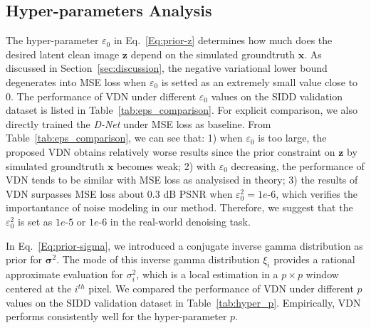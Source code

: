 \documentclass{article}
\begin{document}
\vspace{-1mm}\subsection{Hyper-parameters Analysis}\vspace{-1mm}
The hyper-parameter $\varepsilon_0$ in Eq.~\eqref{Eq:prior-z} determines how much does the desired latent clean
image $\bm{z}$ depend on the simulated groundtruth $\bm{x}$. As discussed in Section~\ref{sec:discussion}, the
negative variational lower bound degenerates into MSE loss when $\varepsilon_0$ is setted as an extremely small
value close to 0. The performance of VDN under different $\varepsilon_0$ values on the SIDD validation dataset
is listed in Table~\ref{tab:eps_comparison}. For explicit comparison, we also directly trained the \textit{D-Net} 
under MSE loss as baseline. From Table~\ref{tab:eps_comparison}, we can see that: 1) when $\varepsilon_0$ is too
large, the proposed VDN obtains relatively worse results since the prior constraint on $\bm{z}$ by simulated
groundtruth $\bm{x}$ becomes weak; 2) with $\varepsilon_0$ decreasing, the performance of VDN tends to be similar
with MSE loss as analysised in theory; 3) the results of VDN surpasses MSE loss about 0.3 dB PSNR
when $\varepsilon_0^2=1e\text{-}6$, which verifies the importantance of noise modeling in our method. Therefore, 
we suggest that the $\varepsilon_0^2$ is set as $1e\text{-}5$ or $1e\text{-}6$ in the real-world denoising task.

In Eq.~\eqref{Eq:prior-sigma}, we introduced a conjugate inverse gamma distribution as prior for $\bm{\sigma}^2$.
The mode of this inverse gamma distribution $\xi_i$ provides a rational approximate evaluation for $\sigma_i^2$,
which is a local estimation in a $p \times p$ window centered at the $i^{th}$ pixel. We compared the performance
of VDN under different $p$ values on the SIDD validation dataset in Table~\ref{tab:hyper_p}. Empirically, VDN
performs consistently well for the hyper-parameter $p$.
\end{document}
